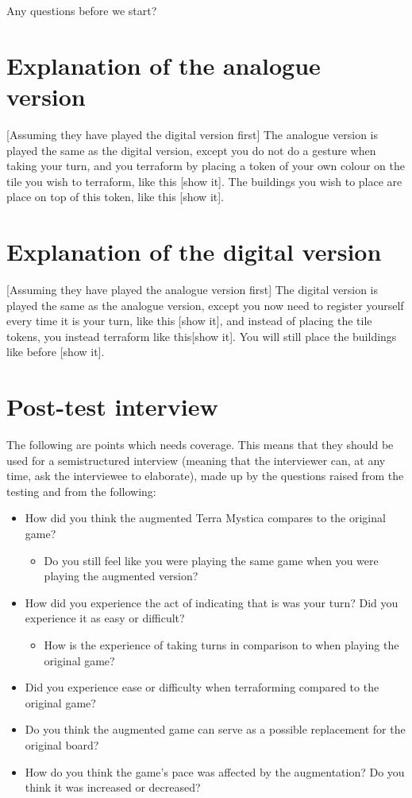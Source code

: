 Any questions before we start?

\section{Explanation of the analogue version}
[Assuming they have played the digital version first]
The analogue version is played the same as the digital version, except you do not do a gesture when taking your turn, and you terraform by placing a token of your own colour on the tile you wish to terraform, like this [show it]. The buildings you wish to place are place on top of this token, like this [show it].

\section{Explanation of the digital version}
[Assuming they have played the analogue version first]
The digital version is played the same as the analogue version, except you now need to register yourself every time it is your turn, like this [show it], and instead of placing the tile tokens, you instead terraform like this[show it]. You will still place the buildings like before [show it].

\section{Post-test interview}
The following are points which needs coverage. This means that they should be used for a semistructured interview (meaning that the interviewer can, at any time, ask the interviewee to elaborate), made up by the questions raised from the testing and from the following: 
\begin{itemize}
\item How did you think the augmented Terra Mystica compares to the original game?
\begin{itemize}
\item Do you still feel like you were playing the same game when you were playing the augmented version?
\end{itemize}
\item How did you experience the act of indicating that is was your turn? Did you experience it as easy or difficult?
\begin{itemize}
\item How is the experience of taking turns in comparison to when playing the original game?
\end{itemize}
\item Did you experience ease or difficulty when terraforming compared to the original game?
\item Do you think the augmented game can serve as a possible replacement for the original board?
\item How do you think the game's pace was affected by the augmentation? Do you think it was increased or decreased?
\end{itemize}


